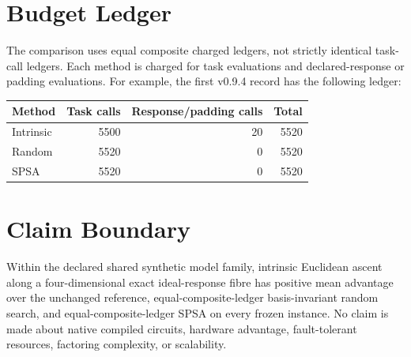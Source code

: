 \documentclass[11pt]{article}
\begin{document}
\section{Budget Ledger}

The comparison uses equal composite charged ledgers, not strictly identical
task-call ledgers. Each method is charged for task evaluations and
declared-response or padding evaluations. For example, the first v0.9.4 record
has the following ledger:

\begin{center}
\begin{tabular}{lrrr}
\toprule
Method & Task calls & Response/padding calls & Total \\
\midrule
Intrinsic & 5500 & 20 & 5520 \\
Random & 5520 & 0 & 5520 \\
SPSA & 5520 & 0 & 5520 \\
\bottomrule
\end{tabular}
\end{center}

\section{Claim Boundary}

Within the declared shared synthetic model family, intrinsic Euclidean ascent
along a four-dimensional exact ideal-response fibre has positive mean advantage
over the unchanged reference, equal-composite-ledger basis-invariant random
search, and equal-composite-ledger SPSA on every frozen instance. No claim is
made about native compiled circuits, hardware advantage, fault-tolerant
resources, factoring complexity, or scalability.



\end{document}
